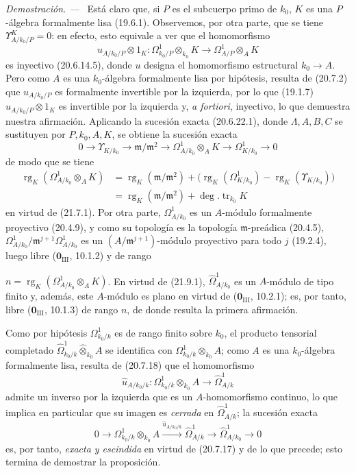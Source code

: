 \documentclass[10pt,oneside]{book}
\newcommand{\oldpage}[2][]{%
  \setcounter{footnote}{0}%
  \marginpar{\scriptsize\textbf{#1}~|~#2}\ignorespaces}
\newenvironment{proof}{%
  \par\medskip\noindent\textit{Demostración. ---\ }}{\par}
\providecommand{\setmin}{-}%
\begin{document}
\begin{proof}
Está claro que, si $P$ es el subcuerpo primo de $k_0$, $K$ es una
$P$-álgebra formalmente lisa (19.6.1). Observemos, por otra parte, que se tiene
$\Upsilon^K_{A/k_0/P}=0$: en efecto, esto equivale a ver que el homomorfismo
\[
  u_{A/k_0/P}\otimes1_K:
  \Omega^1_{k_0/P}\otimes_{k_0}K
  \longrightarrow \Omega^1_{A/P}\otimes_A K
\]
es inyectivo (20.6.14.5), donde $u$ designa el homomorfismo estructural
$k_0\to A$. Pero como $A$ es una $k_0$-álgebra formalmente lisa por hipótesis,
resulta de (20.7.2) que $u_{A/k_0/P}$ es formalmente invertible por la
izquierda, por lo que (19.1.7) $u_{A/k_0/P}\otimes1_K$ es invertible por la
izquierda y, \emph{a fortiori}, inyectivo, lo que demuestra nuestra afirmación.
Aplicando la sucesión exacta (20.6.22.1), donde $\Lambda,A,B,C$ se sustituyen
por $P,k_0,A,K$, se obtiene la sucesión exacta
\[
  0\longrightarrow \Upsilon_{K/k_0}
  \longrightarrow \mathfrak m/\mathfrak m^2
  \longrightarrow \Omega^1_{A/k_0}\otimes_A K
  \longrightarrow \Omega^1_{K/k_0}\longrightarrow0
\]
de modo que se tiene
\[
\begin{split}
  \operatorname{rg}_K(\Omega^1_{A/k_0}\otimes_AK)
  &={\operatorname{rg}}_K(\mathfrak m/\mathfrak m^2)
    +\bigl(\operatorname{rg}_K(\Omega^1_{K/k_0})
    \setmin\operatorname{rg}_K(\Upsilon_{K/k_0})\bigr)\\
  &={\operatorname{rg}}_K(\mathfrak m/\mathfrak m^2)
    +\deg.\operatorname{tr}_{k_0}K
\end{split}
\]
en virtud de (21.7.1). Por otra parte, $\Omega^1_{A/k_0}$ es un
$A$-módulo formalmente proyectivo (20.4.9), y como su topología es la topología
$\mathfrak m$-preádica (20.4.5),
$\Omega^1_{A/k_0}/\mathfrak m^{j+1}\Omega^1_{A/k_0}$ es un
$(A/\mathfrak m^{j+1})$-módulo proyectivo para todo $j$ (19.2.4), luego libre
($\mathbf 0_{\mathrm{III}}$, 10.1.2) y de rango

\oldpage[0\textsubscript{IV-1}]{177}
$n=\operatorname{rg}_K(\Omega^1_{A/k_0}\otimes_AK)$. En virtud de (21.9.1),
$\widehat\Omega^1_{A/k_0}$ es un $A$-módulo de tipo finito y, además, este
$A$-módulo es plano en virtud de ($\mathbf 0_{\mathrm{III}}$, 10.2.1); es,
por tanto, libre ($\mathbf 0_{\mathrm{III}}$, 10.1.3) de rango $n$, de donde
resulta la primera afirmación.

Como por hipótesis $\Omega^1_{k_0/k}$ es de rango finito sobre $k_0$, el
producto tensorial completado
$\widehat\Omega^1_{k_0/k}\widehat\otimes_{k_0}A$ se identifica con
$\Omega^1_{k_0/k}\otimes_{k_0}A$; como $A$ es una $k_0$-álgebra formalmente
lisa, resulta de (20.7.18) que el homomorfismo
\[
  \widehat u_{A/k_0/k}:
  \Omega^1_{k_0/k}\otimes_{k_0}A
  \longrightarrow\widehat\Omega^1_{A/k}
\]
admite un inverso por la izquierda que es un $A$-homomorfismo continuo, lo que
implica en particular que su imagen es \emph{cerrada} en
$\widehat\Omega^1_{A/k}$; la sucesión exacta
\[
  0\longrightarrow \Omega^1_{k_0/k}\otimes_{k_0}A
  \xrightarrow{\widehat u_{A/k_0/k}}\widehat\Omega^1_{A/k}
  \longrightarrow\widehat\Omega^1_{A/k_0}\longrightarrow0
\]
es, por tanto, \emph{exacta y escindida} en virtud de (20.7.17) y de lo que precede;
esto termina de demostrar la proposición.
\end{proof}
\end{document}
